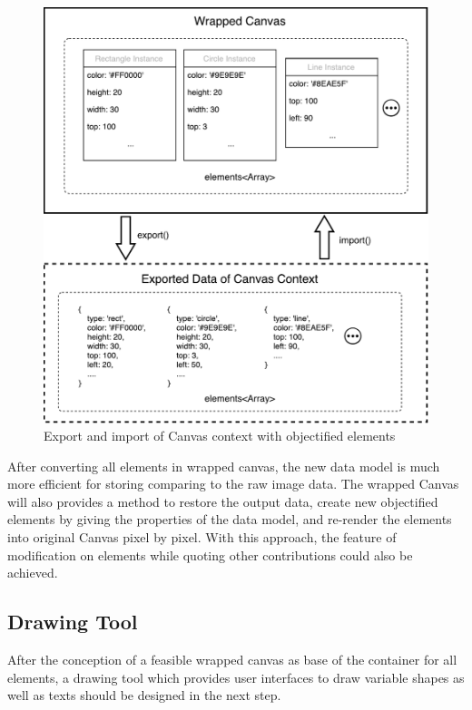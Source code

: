 \begin{figure}[!htbp]
  \centering
    \includegraphics[width=1\textwidth]{Figures/concept-wrapped-canvas-data.pdf}
  \caption{Export and import of Canvas context with objectified elements}
  \label{fig:wrapped-canvas-data}
\end{figure}

After converting all elements in wrapped canvas, the new data model is much more efficient for storing comparing to the raw image data. The wrapped Canvas will also provides a method to restore the output data, create new objectified elements by giving the properties of the data model, and re-render the elements into original Canvas pixel by pixel. With this approach, the feature of modification on elements while quoting other contributions could also be achieved. 

\subsection{Drawing Tool}

After the conception of a feasible wrapped canvas as base of the container for all elements, a drawing tool which provides user interfaces to draw variable shapes as well as texts should be designed in the next step. 

